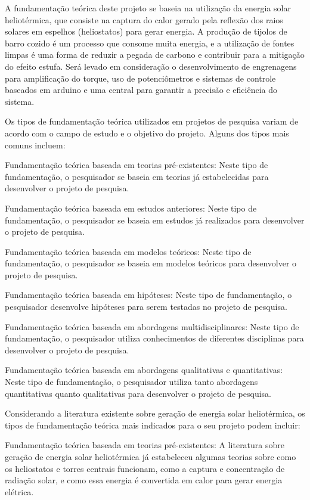 A fundamentação teórica deste projeto se baseia na utilização da energia solar heliotérmica, que consiste na captura do calor gerado pela reflexão dos raios solares em espelhos (heliostatos) para gerar energia. A produção de tijolos de barro cozido é um processo que consome muita energia, e a utilização de fontes limpas é uma forma de reduzir a pegada de carbono e contribuir para a mitigação do efeito estufa. Será levado em consideração o desenvolvimento de engrenagens para amplificação do torque, uso de potenciômetros e sistemas de controle baseados em arduino e uma central para garantir a precisão e eficiência do sistema.


Os tipos de fundamentação teórica utilizados em projetos de pesquisa variam de acordo com o campo de estudo e o objetivo do projeto. Alguns dos tipos mais comuns incluem:

Fundamentação teórica baseada em teorias pré-existentes: Neste tipo de fundamentação, o pesquisador se baseia em teorias já estabelecidas para desenvolver o projeto de pesquisa.

Fundamentação teórica baseada em estudos anteriores: Neste tipo de fundamentação, o pesquisador se baseia em estudos já realizados para desenvolver o projeto de pesquisa.

Fundamentação teórica baseada em modelos teóricos: Neste tipo de fundamentação, o pesquisador se baseia em modelos teóricos para desenvolver o projeto de pesquisa.

Fundamentação teórica baseada em hipóteses: Neste tipo de fundamentação, o pesquisador desenvolve hipóteses para serem testadas no projeto de pesquisa.

Fundamentação teórica baseada em abordagens multidisciplinares: Neste tipo de fundamentação, o pesquisador utiliza conhecimentos de diferentes disciplinas para desenvolver o projeto de pesquisa.

Fundamentação teórica baseada em abordagens qualitativas e quantitativas: Neste tipo de fundamentação, o pesquisador utiliza tanto abordagens quantitativas quanto qualitativas para desenvolver o projeto de pesquisa.


Considerando a literatura existente sobre geração de energia solar heliotérmica, os tipos de fundamentação teórica mais indicados para o seu projeto podem incluir:

Fundamentação teórica baseada em teorias pré-existentes: A literatura sobre geração de energia solar heliotérmica já estabeleceu algumas teorias sobre como os heliostatos e torres centrais funcionam, como a captura e concentração de radiação solar, e como essa energia é convertida em calor para gerar energia elétrica.

